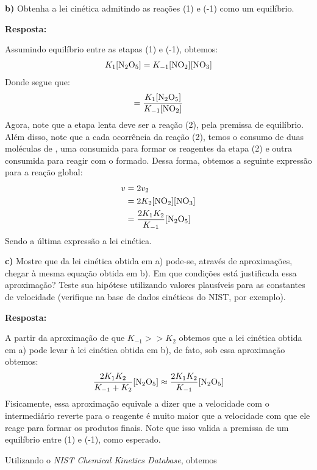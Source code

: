 \textbf{b)} Obtenha a lei cinética admitindo as reações (1) e (-1) como um equilíbrio.

\textbf{Resposta:}

Assumindo equilíbrio entre as etapas (1) e (-1), obtemos:
\begin{align*}
    K_1 [\ce{N2O5}] = K_{-1} [\ce{NO2}][\ce{NO3}]
\end{align*}
Donde segue que:
\begin{align*}
    [\ce{NO3}] = \frac{K_1 [\ce{N2O5}]}{K_{-1} [\ce{NO2}]} 
\end{align*}
Agora, note que a etapa lenta deve ser a reação (2), pela premissa de equilíbrio. Além disso, note que a cada ocorrência da reação (2), temos o consumo de duas moléculas de , uma consumida para formar os reagentes da etapa (2) e outra consumida para reagir com o  formado. Dessa forma, obtemos a seguinte expressão para a reação global:
\begin{align*}
    v &= 2 v_2\\
      &= 2 K_2 [\ce{NO2}][\ce{NO3}]\\
      &= \frac{2 K_1 K_2}{K_{-1}} [\ce{N2O5}]
\end{align*}
Sendo a última expressão a lei cinética.

\textbf{c)} Mostre que da lei cinética obtida em a) pode-se, através de aproximações, chegar à mesma equação obtida em b). Em que condições está justificada essa aproximação? Teste sua hipótese utilizando valores plausíveis para as constantes de velocidade (verifique na base de dados cinéticos do NIST, por exemplo).

\textbf{Resposta:}

A partir da aproximação de que \( K_{-1} >> K_2 \) obtemos que a lei cinética obtida em a) pode levar à lei cinética obtida em b), de fato, sob essa aproximação obtemos:
\begin{align*}
    \frac{2K_1K_2}{K_{-1} + K_2} [\ce{N2O5}] \approx \frac{2K_1K_2}{K_{-1}} [\ce{N2O5}] 
\end{align*}
Fisicamente, essa aproximação equivale a dizer que a velocidade com o intermediário  reverte para o reagente  é muito maior que a velocidade com que ele reage para formar os produtos finais. Note que isso valida a premissa de um equilíbrio entre (1) e (-1), como esperado.

Utilizando o \textit{NIST Chemical Kinetics Database}, obtemos
